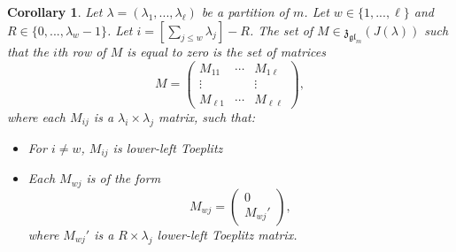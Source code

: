 \documentclass[12pt,psamsfonts]{article}
\DeclareMathOperator{\gl}{\mathfrak{gl}}
\newtheorem{corollary}[theorem]{Corollary}
\begin{document}
\begin{corollary}\label{nilpotent_centralizer_row_zero}
    Let \(\lambda = (\lambda_1, ..., \lambda_\ell)\) be a partition of \(m\).
    Let \(w \in \{1, ..., \ell\}\) and \(R \in \{0, ..., \lambda_w - 1\}\).
    Let \(i = [\sum_{j \leq w} \lambda_j] - R\).
    The set of \(M \in \mathfrak{z}_{\gl_m}(J(\lambda))\) such that the \(i\)th row of \(M\) is equal to zero is the set of matrices
    \[M = \begin{pmatrix}
        M_{11} & \cdots & M_{1\ell} \\
        \vdots & & \vdots\\
        M_{\ell 1} & \cdots & M_{\ell\ell}
    \end{pmatrix},\]
    where each \(M_{ij}\) is a \(\lambda_i \times \lambda_j\) matrix, such that:
    \begin{itemize}
        \item For \(i \neq w\), \(M_{ij}\) is lower-left Toeplitz
        \item Each \(M_{wj}\) is of the form
        \[M_{wj} = \begin{pmatrix}
            0\\
            M_{wj}'
        \end{pmatrix},\]
        where \(M_{wj}'\) is a \(R \times \lambda_j\) lower-left Toeplitz matrix.
    \end{itemize}
\end{corollary}
\end{document}
